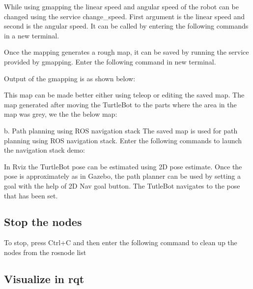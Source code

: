 While using gmapping the linear speed and angular speed of the robot can be changed using the service change\+\_\+speed. First argument is the linear speed and second is the angular speed. It can be called by entering the following commands in a new terminal. 
\begin{DoxyCode}{0}
\end{DoxyCode}


Once the mapping generates a rough map, it can be saved by running the service provided by gmapping. Enter the following command in new terminal. 
\begin{DoxyCode}{0}
\end{DoxyCode}
 Output of the gmapping is as shown below\+: 

 

This map can be made better either using teleop or editing the saved map. The map generated after moving the Turtle\+Bot to the parts where the area in the map was grey, we the the below map\+: 

 

b. Path planning using R\+OS navigation stack The saved map is used for path planning using R\+OS navigation stack. Enter the following commands to launch the navigation stack demo\+: 
\begin{DoxyCode}{0}
\end{DoxyCode}
 In Rviz the Turtle\+Bot pose can be estimated using 2D pose estimate. Once the pose is approximately as in Gazebo, the path planner can be used by setting a goal with the help of 2D Nav goal button. The Tutle\+Bot navigates to the pose that has been set.

\subsection*{Stop the nodes}

To stop, press Ctrl+C and then enter the following command to clean up the nodes from the rosnode list 
\begin{DoxyCode}{0}
\end{DoxyCode}


\subsection*{Visualize in rqt}

